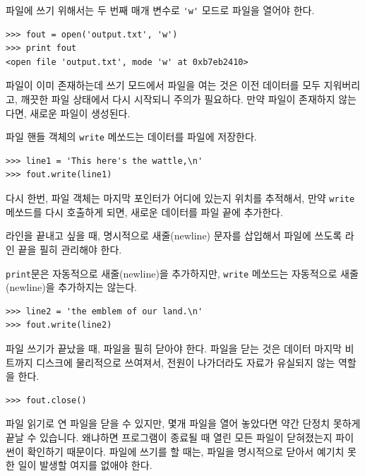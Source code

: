 
파일에 쓰기 위해서는 두 번째 매개 변수로 \verb"'w'" 모드로 파일을 열어야 한다.

\beforeverb
\begin{verbatim}
>>> fout = open('output.txt', 'w')
>>> print fout
<open file 'output.txt', mode 'w' at 0xb7eb2410>
\end{verbatim}
\afterverb
%

파일이 이미 존재하는데 쓰기 모드에서 파일을 여는 것은 이전 데이터를 모두 지워버리고, 
깨끗한 파일 상태에서 다시 시작되니 주의가 필요하다. 
만약 파일이 존재하지 않는다면, 새로운 파일이 생성된다.

파일 핸들 객체의 {\tt write} 메쏘드는 데이터를 파일에 저장한다.

\beforeverb
\begin{verbatim}
>>> line1 = 'This here's the wattle,\n'
>>> fout.write(line1)
\end{verbatim}
\afterverb
%

다시 한번, 파일 객체는 마지막 포인터가 어디에 있는지 위치를 추적해서, 
만약 {\tt write} 메쏘드를 다시 호출하게 되면, 새로운 데이터를 파일 끝에 추가한다.

라인을 끝내고 싶을 때, 명시적으로 새줄(newline) 문자를 삽입해서 파일에 쓰도록 라인 끝을 필히 관리해야 한다.

{\tt print}문은 자동적으로 새줄(newline)을 추가하지만, {\tt write} 메쏘드는 자동적으로 새줄(newline)을 추가하지는 않는다.

\beforeverb
\begin{verbatim}
>>> line2 = 'the emblem of our land.\n'
>>> fout.write(line2)
\end{verbatim}
\afterverb
%

파일 쓰기가 끝났을 때, 파일을 필히 닫아야 한다.
파일을 닫는 것은 데이터 마지막 비트까지 디스크에 물리적으로 쓰여져서, 
전원이 나가더라도 자료가 유실되지 않는 역할을 한다.

\beforeverb
\begin{verbatim}
>>> fout.close()
\end{verbatim}
\afterverb
%

파일 읽기로 연 파일을 닫을 수 있지만, 몇개 파일을 열어 놓았다면 약간 단정치 못하게 끝날 수 있습니다. 
왜냐하면 프로그램이 종료될 때 열린 모든 파일이 닫혀졌는지 파이썬이 확인하기 때문이다. 
파일에 쓰기를 할 때는, 파일을 명시적으로 닫아서 예기치 못한 일이 발생할 여지를 없애야 한다.



